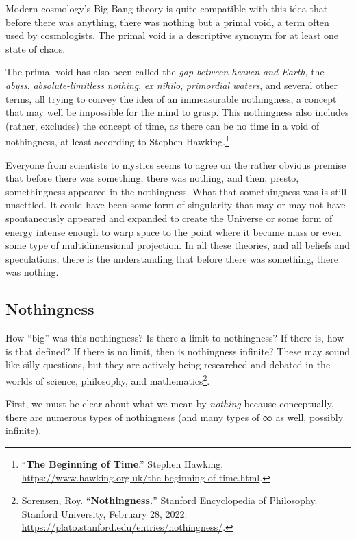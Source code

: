 \documentclass[
]{article}
\begin{document}
Modern cosmology's Big Bang theory is quite compatible with this idea
that before there was anything, there was nothing but a primal void, a
term often used by cosmologists. The primal void is a descriptive
synonym for at least one state of chaos.

The primal void has also been called the \emph{gap between heaven and
Earth}, the \emph{abyss}, \emph{absolute-limitless nothing}, \emph{ex
nihilo}, \emph{primordial waters}, and several other terms, all trying
to convey the idea of an immeasurable nothingness, a concept that may
well be impossible for the mind to grasp. This nothingness also includes
(rather, excludes) the concept of time, as there can be no time in a
void of nothingness, at least according to Stephen Hawking.\footnote{``\textbf{The
  Beginning of Time}.'' Stephen Hawking,
  \url{https://www.hawking.org.uk/the-beginning-of-time.html}.}

Everyone from scientists to mystics seems to agree on the rather obvious
premise that before there was something, there was nothing, and then,
presto, somethingness appeared in the nothingness. What that
somethingness was is still unsettled. It could have been some form of
singularity that may or may not have spontaneously appeared and expanded
to create the Universe or some form of energy intense enough to warp
space to the point where it became mass or even some type of
multidimensional projection. In all these theories, and all beliefs and
speculations, there is the understanding that before there was
something, there was nothing.

\subsection{Nothingness}\label{nothingness}

How ``big'' was this nothingness? Is there a limit to nothingness? If
there is, how is that defined? If there is no limit, then is nothingness
infinite? These may sound like silly questions, but they are actively
being researched and debated in the worlds of science, philosophy, and
mathematics\footnote{Sorensen, Roy. ``\textbf{Nothingness.}'' Stanford
  Encyclopedia of Philosophy. Stanford University, February 28, 2022.
  \url{https://plato.stanford.edu/entries/nothingness/}.}.

First, we must be clear about what we mean by \emph{nothing} because
conceptually, there are numerous types of nothingness (and many types of
∞ as well, possibly infinite).
\end{document}
